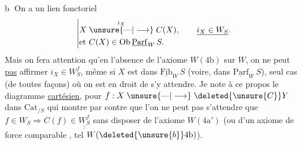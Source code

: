 \textcircled{b} On a un lien fonctoriel
\[
\left|\begin{aligned}
&X\mathrel{\overset{i_X}{\unsure{\text{---}|\longrightarrow}}}C(X),\qquad\underline{i_X\in W_S}.\\
&\text{et }C(X)\in\mathrm{Ob}\,\underline{\mathrm{Parf}}_W\,S .
\end{aligned}\right.
\]
Mais on fera attention qu'en l'absence de l'axiome
\margin{$\vert\vert\vert$}$W(4\mathrm{b})$ sur $W$, on ne peut \uline{pas} affirmer $i_X\in W_S^f$,
même si $X$ est dans $\underline{\mathrm{Fib}}_W\,S$ (voire, dans $\underline{\mathrm{Parf}}_W\,S$),
seul cas (de toutes façons) où on est en droit de s'y
attendre. Je note à ce propos le diagramme \uline{cartésien},
pour $f:X\mathrel{\unsure{\text{---}|\longrightarrow}}\deleted{\unsure{C}}Y$ dans $\mathrm{Cat}_{/S}$
qui montre par contre que 
l'on ne peut pas s'attendre que $f\in W_S\Rightarrow C(f)\in\underline{\underline{W_S^f}}$
sans disposer de l'axiome $W(4\mathrm{a}')$ (ou d'un
axiome de force comparable \deleted{\unsure{)}}, tel $W(\deleted{\unsure{b}}4\mathrm{b})$).

